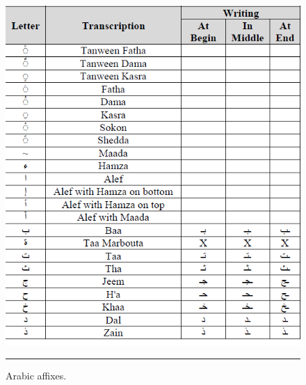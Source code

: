 \begin{figure}[htbp]
	\centering
		\includegraphics{./Figures/pre_3.png}
		\rule{35em}{0.5pt}
	\caption[Arabic affixes.]{Arabic affixes.}
	\label{fig:pre_3}
\end{figure}

